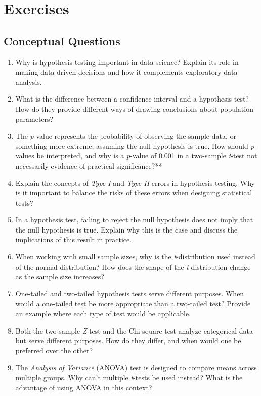 \documentclass[
]{book}
\theoremstyle{definition}
\theoremstyle{definition}
\theoremstyle{definition}
\theoremstyle{definition}
\theoremstyle{remark}
\begin{document}
\section{Exercises}\label{exercises-4}

\subsection*{Conceptual Questions}\label{conceptual-questions-1}

\begin{enumerate}
\def\labelenumi{\arabic{enumi}.}
\item
  Why is hypothesis testing important in data science? Explain its role in making data-driven decisions and how it complements exploratory data analysis.
\item
  What is the difference between a confidence interval and a hypothesis test? How do they provide different ways of drawing conclusions about population parameters?
\item
  The \emph{p}-value represents the probability of observing the sample data, or something more extreme, assuming the null hypothesis is true. How should \emph{p}-values be interpreted, and why is a \emph{p}-value of 0.001 in a two-sample \emph{t}-test not necessarily evidence of practical significance?**
\item
  Explain the concepts of \emph{Type I} and \emph{Type II} errors in hypothesis testing. Why is it important to balance the risks of these errors when designing statistical tests?
\item
  In a hypothesis test, failing to reject the null hypothesis does not imply that the null hypothesis is true. Explain why this is the case and discuss the implications of this result in practice.
\item
  When working with small sample sizes, why is the \emph{t}-distribution used instead of the normal distribution? How does the shape of the \emph{t}-distribution change as the sample size increases?
\item
  One-tailed and two-tailed hypothesis tests serve different purposes. When would a one-tailed test be more appropriate than a two-tailed test? Provide an example where each type of test would be applicable.
\item
  Both the two-sample \emph{Z}-test and the Chi-square test analyze categorical data but serve different purposes. How do they differ, and when would one be preferred over the other?
\item
  The \emph{Analysis of Variance} (ANOVA) test is designed to compare means across multiple groups. Why can't multiple \emph{t}-tests be used instead? What is the advantage of using ANOVA in this context?
\end{enumerate}
\end{document}
